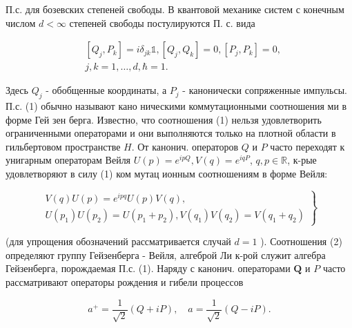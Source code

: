 \documentclass[10pt]{article}
\begin{document}
П.с. для бозевских степеней свободы. В квантовой механике систем с конечным числом $d<\infty$ степеней свободы постулируются П. с. вида



\[

\begin{aligned}

& {\left[Q_{j}, P_{k}\right]=i \delta_{j k} \mathbb{1},\left[Q_{j}, Q_{k}\right]=0,\left[P_{j}, P_{k}\right]=0,} \\

& j, k=1, \ldots, d, \hbar=1 .

\end{aligned}

\]



Здесь $Q_{j}$ - обобщенные координаты, а $P_{j}$ - канонически сопряженные импульсы. П.с. (1) обычно называют кано ническими коммутационными соотношения ми в форме Гей зен берга. Известно, что соотношения (1) нельзя удовлетворить ограниченными операторами и они выполняются только на плотной области в гильбертовом пространстве $H$. От канонич. операторов $Q$ и $P$ часто переходят к унигарным операторам Вейля $U(p)=e^{i p Q}, V(q)=e^{i q P}$, $q, p \in \mathbb{R}$, к-рые удовлетворяют в силу (1) ком мутац ионным соотношениям в форме Вейля:



\[

\left.\begin{array}{l}

V(q) U(p)=e^{i p q} U(p) V(q), \\

U\left(p_{1}\right) U\left(p_{2}\right)=U\left(p_{1}+p_{2}\right), V\left(q_{1}\right) V\left(q_{2}\right)=V\left(q_{1}+q_{2}\right)

\end{array}\right\}

\]



(для упрощения обозначений рассматривается случай $d=1$ ). Соотношения (2) определяют группу Гейзенберга - Вейля, алгеброй Ли к-рой служит алгебра Гейзенберга, порождаемая П.с. (1). Наряду с канонич. операторами $\boldsymbol{Q}$ и $P$ часто рассматривают операторы рождения и гибели процессов



\[

a^{+}=\frac{1}{\sqrt{2}}(Q+i P), \quad a=\frac{1}{\sqrt{2}}(Q-i P) .

\]
\end{document}
